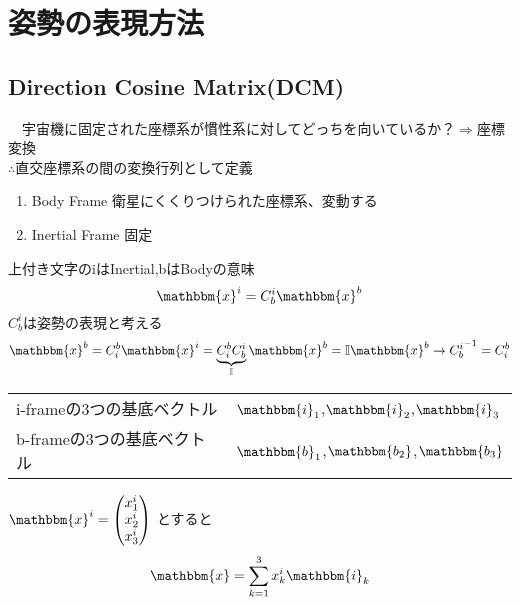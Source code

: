 \documentclass[class=article, crop=false, preview=false, dvipdfmx, a4paper]{standalone}
\begin{document}
\section{姿勢の表現方法}

\subsection{Direction Cosine Matrix(DCM)}
　宇宙機に固定された座標系が慣性系に対してどっちを向いているか？$\Rightarrow$座標変換\\
 $\therefore$直交座標系の間の変換行列として定義
\begin{enumerate}[label = \maru{\theenumi}]
 \item Body Frame 衛星にくくりつけられた座標系、変動する 
 \item Inertial Frame 固定
 \end{enumerate}
 上付き文字のiはInertial,bはBodyの意味
 \[ \mathbbm{x}^i=C^i_b\mathbbm{x}^b \]
 $C^i_b$は姿勢の表現と考える
 \[ \mathbbm{x}^b = C^b_i \mathbbm{x}^i = \underbrace{C^b_i C^i_b}_{\mathbb{I}} \mathbbm{x}^b = \mathbb{I} \mathbbm{x}^b
 	\rightarrow {C^i_b}^{-1} = C^b_i \]

\begin{tabular}{ll}
i-frameの3つの基底ベクトル & $\mathbbm{i}_1$,$\mathbbm{i}_2$,$\mathbbm{i}_3$ \\
b-frameの3つの基底ベクトル & $\mathbbm{b}_1$,$\mathbbm{b_2}$,$\mathbbm{b_3}$
\end{tabular}

$\mathbbm{x}^i=
 	\begin{pmatrix}
    	x^i_1\\
        x^i_2\\
        x^i_3\\
    \end{pmatrix}$
とすると
\begin{equation}
\mathbbm{x} = \sum_{k=1}^{3} x^i_k \mathbbm{i}_k \label{eq:1}
\end{equation}
\end{document}

